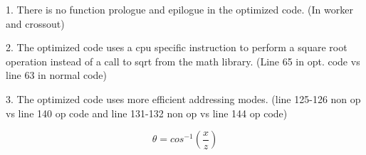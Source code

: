 \documentclass[11pt]{article}
\begin{document}
1. There is no function prologue and epilogue in the optimized code. (In worker and crossout)

2. The optimized code uses a cpu specific instruction to perform a square root operation instead of a call to sqrt from the math library. (Line 65 in opt. code vs line 63 in normal code)

3. The optimized code uses more efficient addressing modes. (line 125-126 non op vs line 140 op code and line 131-132 non op vs line 144 op code)


\begin{equation}
\theta = cos^{-1}(\frac{x}{z})  %
\end{equation}

\end{document}
